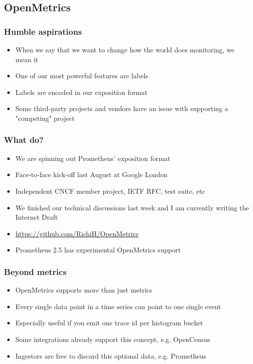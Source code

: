 \documentclass[t]{beamer}
\begin{document}
\subsection{OpenMetrics}

\begin{frame}
	\frametitle{Humble aspirations}
	\begin{itemize}
		\item When we say that we want to change how the world does monitoring, we mean it
		\item One of our most powerful features are labels
		\item Labels are encoded in our exposition format
		\item Some third-party projects and vendors have an issue with supporting a "competing" project
	\end{itemize}
\end{frame}

\begin{frame}
	\frametitle{What do?}
	\begin{itemize}
		\item We are spinning out Prometheus' exposition format
		\item Face-to-face kick-off last August at Google London
		\item Independent CNCF member project, IETF RFC, test suite, etc
		\item We finished our technical discussions last week and I am currently writing the Internet Draft
		\item \url{https://github.com/RichiH/OpenMetrics}
		\item Prometheus 2.5 has experimental OpenMetrics support
	\end{itemize}
\end{frame}

\begin{frame}
	\frametitle{Beyond metrics}
	\begin{itemize}
		\item OpenMetrics supports more than just metrics
		\item Every single data point in a time series can point to one single event
		\item Especially useful if you emit one trace id per histogram bucket
		\item Some integrations already support this concept, e.g. OpenCensus
		\item Ingestors are free to discard this optional data, e.g. Prometheus
	\end{itemize}
\end{frame}
\end{document}
